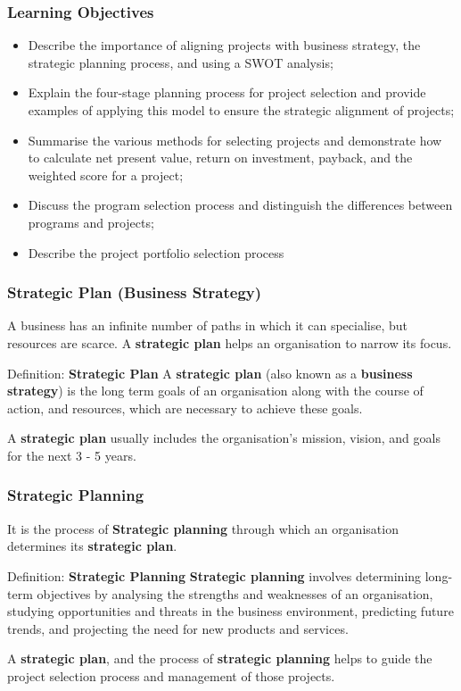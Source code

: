 \documentclass[aspectratio=169]{beamer}
\begin{document}
\begin{frame}
\frametitle{Learning Objectives}
\begin{itemize}
\item Describe the importance of aligning projects with business strategy, the strategic planning process, and using a SWOT analysis;
\item Explain the four-stage planning process for project selection and provide examples of applying this model to ensure the strategic alignment of projects;
\item Summarise the various methods for selecting projects and demonstrate how to calculate net present value, return on investment, payback, and the weighted score for a project;
\item Discuss the program selection process and distinguish the differences between programs and projects;
\item Describe the project portfolio selection process
\end{itemize}
\end{frame}

\begin{frame}
\frametitle{Strategic Plan (Business Strategy)}
A business has an infinite number of paths in which it can specialise, but resources are scarce. A \textbf{strategic plan} helps an organisation to narrow its focus.
\vspace{0.5cm}
\begin{block}{Definition: \textbf{Strategic Plan}}
A \textbf{strategic plan} (also known as a \textbf{business strategy}) is the long term goals of an organisation along with the course of action, and resources, which are necessary to achieve these goals.
\end{block}
\vspace{0.5cm}
A \textbf{strategic plan} usually includes the organisation's mission, vision, and goals for the next 3 - 5 years.
\end{frame}

\begin{frame}
\frametitle{Strategic Planning}
 It is the process of \textbf{Strategic planning} through which an organisation determines its \textbf{strategic plan}.

\vspace{0.5cm}
\begin{block}{Definition: \textbf{Strategic Planning}}
\textbf{Strategic planning} involves determining long-term objectives by analysing the strengths and weaknesses of an organisation, studying opportunities and threats in the business environment, predicting future trends, and projecting the need for new products and services.
\end{block}
\vspace{0.5cm}

A \textbf{strategic plan}, and the process of \textbf{strategic planning} helps to guide the project selection process and management of those projects.
\end{frame}
\end{document}
